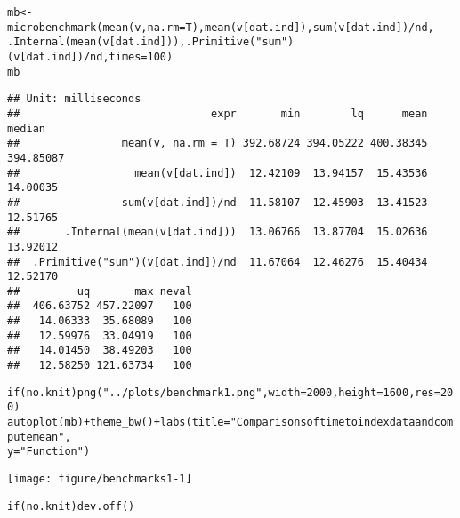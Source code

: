 \documentclass{article}\usepackage[]{graphicx}\usepackage[]{color}
\makeatletter
\def\maxwidth{ %
  \ifdim\Gin@nat@width>\linewidth
    \linewidth
  \else
    \Gin@nat@width
  \fi
}
\newcommand{\hlnum}[1]{\textcolor[rgb]{0.863,0.196,0.184}{#1}}%
\newcommand{\hlstr}[1]{\textcolor[rgb]{0.863,0.196,0.184}{#1}}%
\newcommand{\hlopt}[1]{\textcolor[rgb]{0.576,0.631,0.631}{#1}}%
\newcommand{\hlstd}[1]{\textcolor[rgb]{0.514,0.58,0.588}{#1}}%
\newcommand{\hlkwa}[1]{\textcolor[rgb]{0.796,0.294,0.086}{#1}}%
\newcommand{\hlkwb}[1]{\textcolor[rgb]{0.522,0.6,0}{#1}}%
\newcommand{\hlkwc}[1]{\textcolor[rgb]{0.796,0.294,0.086}{#1}}%
\newcommand{\hlkwd}[1]{\textcolor[rgb]{0.576,0.631,0.631}{#1}}%
\newenvironment{kframe}{%
 \def\at@end@of@kframe{}%
 \ifinner\ifhmode%
  \def\at@end@of@kframe{\end{minipage}}%
  \begin{minipage}{\columnwidth}%
 \fi\fi%
 \def\FrameCommand##1{\hskip\@totalleftmargin \hskip-\fboxsep
 \colorbox{shadecolor}{##1}\hskip-\fboxsep
     \hskip-\linewidth \hskip-\@totalleftmargin \hskip\columnwidth}%
 \MakeFramed {\advance\hsize-\width
   \@totalleftmargin\z@ \linewidth\hsize
   \@setminipage}}%
 {\par\unskip\endMakeFramed%
 \at@end@of@kframe}
\newenvironment{knitrout}{}{} %
\makeatother
\begin{document}
\begin{knitrout}
\color{fgcolor}\begin{kframe}
\begin{alltt}
\hlstd{mb} \hlkwb{<-} \hlkwd{microbenchmark}\hlstd{(}\hlkwd{mean}\hlstd{(v,} \hlkwc{na.rm} \hlstd{= T),} \hlkwd{mean}\hlstd{(v[dat.ind]),} \hlkwd{sum}\hlstd{(v[dat.ind])}\hlopt{/}\hlstd{nd,}
    \hlkwd{.Internal}\hlstd{(}\hlkwd{mean}\hlstd{(v[dat.ind])),} \hlkwd{.Primitive}\hlstd{(}\hlstr{"sum"}\hlstd{)(v[dat.ind])}\hlopt{/}\hlstd{nd,} \hlkwc{times} \hlstd{=} \hlnum{100}\hlstd{)}
\hlstd{mb}
\end{alltt}
\begin{verbatim}
## Unit: milliseconds
##                              expr       min        lq      mean    median
##                mean(v, na.rm = T) 392.68724 394.05222 400.38345 394.85087
##                  mean(v[dat.ind])  12.42109  13.94157  15.43536  14.00035
##                sum(v[dat.ind])/nd  11.58107  12.45903  13.41523  12.51765
##       .Internal(mean(v[dat.ind]))  13.06766  13.87704  15.02636  13.92012
##  .Primitive("sum")(v[dat.ind])/nd  11.67064  12.46276  15.40434  12.52170
##         uq       max neval
##  406.63752 457.22097   100
##   14.06333  35.68089   100
##   12.59976  33.04919   100
##   14.01450  38.49203   100
##   12.58250 121.63734   100
\end{verbatim}
\begin{alltt}
\hlkwa{if} \hlstd{(no.knit)} \hlkwd{png}\hlstd{(}\hlstr{"../plots/benchmark1.png"}\hlstd{,} \hlkwc{width} \hlstd{=} \hlnum{2000}\hlstd{,} \hlkwc{height} \hlstd{=} \hlnum{1600}\hlstd{,} \hlkwc{res} \hlstd{=} \hlnum{200}\hlstd{)}
\hlkwd{autoplot}\hlstd{(mb)} \hlopt{+} \hlkwd{theme_bw}\hlstd{()} \hlopt{+} \hlkwd{labs}\hlstd{(}\hlkwc{title} \hlstd{=} \hlstr{"Comparisons of time to index data and compute mean"}\hlstd{,}
    \hlkwc{y} \hlstd{=} \hlstr{"Function"}\hlstd{)}
\end{alltt}
\end{kframe}
\texttt{[image: figure/benchmarks1-1]} 
\begin{kframe}\begin{alltt}
\hlkwa{if} \hlstd{(no.knit)} \hlkwd{dev.off}\hlstd{()}
\end{alltt}
\end{kframe}
\end{knitrout}
\end{document}
